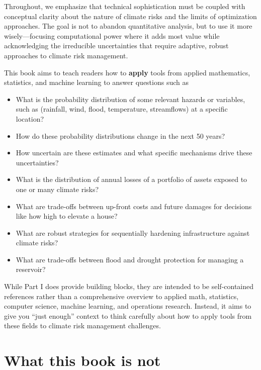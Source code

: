 \documentclass[
  letterpaper,
  DIV=11,
  numbers=noendperiod]{scrreprt}
\providecommand{\tightlist}{%
  \setlength{\itemsep}{0pt}\setlength{\parskip}{0pt}}
\begin{document}
Throughout, we emphasize that technical sophistication must be coupled
with conceptual clarity about the nature of climate risks and the limits
of optimization approaches. The goal is not to abandon quantitative
analysis, but to use it more wisely---focusing computational power where
it adds most value while acknowledging the irreducible uncertainties
that require adaptive, robust approaches to climate risk management.

This book aims to teach readers how to \textbf{apply} tools from applied
mathematics, statistics, and machine learning to answer questions such
as

\begin{itemize}
\tightlist
\item
  What is the probability distribution of some relevant hazards or
  variables, such as (rainfall, wind, flood, temperature, streamflows)
  at a specific location?
\item
  How do these probability distributions change in the next 50 years?
\item
  How uncertain are these estimates and what specific mechanisms drive
  these uncertainties?
\item
  What is the distribution of annual losses of a portfolio of assets
  exposed to one or many climate risks?
\item
  What are trade-offs between up-front costs and future damages for
  decisions like how high to elevate a house?
\item
  What are robust strategies for sequentially hardening infrastructure
  against climate risks?
\item
  What are trade-offs between flood and drought protection for managing
  a reservoir?
\end{itemize}

While Part I does provide building blocks, they are intended to be
self-contained references rather than a comprehensive overview to
applied math, statistics, computer science, machine learning, and
operations research. Instead, it aims to give you ``just enough''
context to think carefully about how to apply tools from these fields to
climate risk management challenges.

\section*{What this book is not}\label{what-this-book-is-not}
\end{document}
